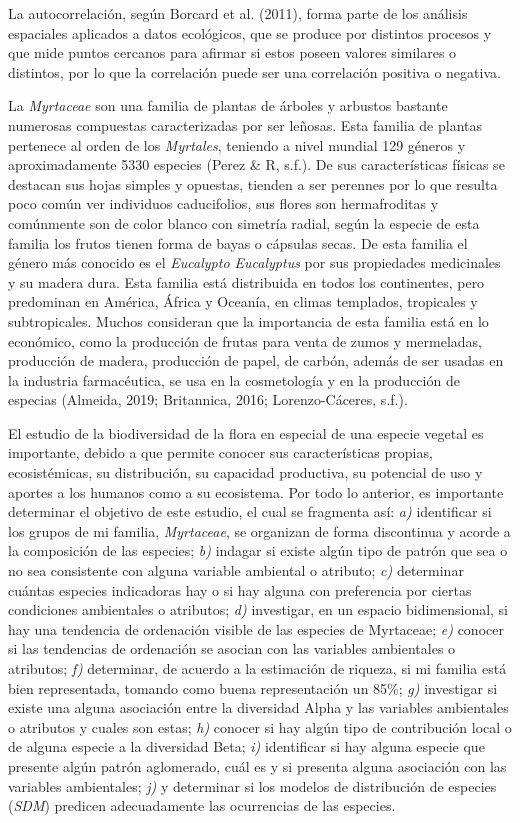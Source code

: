 \documentclass[11pt,]{article}
\begin{document}
La autocorrelación, según Borcard et al. (2011), forma parte de los
análisis espaciales aplicados a datos ecológicos, que se produce por
distintos procesos y que mide puntos cercanos para afirmar si estos
poseen valores similares o distintos, por lo que la correlación puede
ser una correlación positiva o negativa.

La \emph{Myrtaceae} son una familia de plantas de árboles y arbustos
bastante numerosas compuestas caracterizadas por ser leñosas. Esta
familia de plantas pertenece al orden de los \emph{Myrtales}, teniendo a
nivel mundial 129 géneros y aproximadamente 5330 especies (Perez \& R,
s.f.). De sus características físicas se destacan sus hojas simples y
opuestas, tienden a ser perennes por lo que resulta poco común ver
individuos caducifolios, sus flores son hermafroditas y comúnmente son
de color blanco con simetría radial, según la especie de esta familia
los frutos tienen forma de bayas o cápsulas secas. De esta familia el
género más conocido es el \emph{Eucalypto Eucalyptus} por sus
propiedades medicinales y su madera dura. Esta familia está distribuida
en todos los continentes, pero predominan en América, África y Oceanía,
en climas templados, tropicales y subtropicales. Muchos consideran que
la importancia de esta familia está en lo económico, como la producción
de frutas para venta de zumos y mermeladas, producción de madera,
producción de papel, de carbón, además de ser usadas en la industria
farmacéutica, se usa en la cosmetología y en la producción de especias
(Almeida, 2019; Britannica, 2016; Lorenzo-Cáceres, s.f.).

El estudio de la biodiversidad de la flora en especial de una especie
vegetal es importante, debido a que permite conocer sus características
propias, ecosistémicas, su distribución, su capacidad productiva, su
potencial de uso y aportes a los humanos como a su ecosistema. Por todo
lo anterior, es importante determinar el objetivo de este estudio, el
cual se fragmenta así: \emph{a)} identificar si los grupos de mi
familia, \emph{Myrtaceae}, se organizan de forma discontinua y acorde a
la composición de las especies; \emph{b)} indagar si existe algún tipo
de patrón que sea o no sea consistente con alguna variable ambiental o
atributo; \emph{c)} determinar cuántas especies indicadoras hay o si hay
alguna con preferencia por ciertas condiciones ambientales o atributos;
\emph{d)} investigar, en un espacio bidimensional, si hay una tendencia
de ordenación visible de las especies de Myrtaceae; \emph{e)} conocer si
las tendencias de ordenación se asocian con las variables ambientales o
atributos; \emph{f)} determinar, de acuerdo a la estimación de riqueza,
si mi familia está bien representada, tomando como buena representación
un 85\%; \emph{g)} investigar si existe una alguna asociación entre la
diversidad Alpha y las variables ambientales o atributos y cuales son
estas; \emph{h)} conocer si hay algún tipo de contribución local o de
alguna especie a la diversidad Beta; \emph{i)} identificar si hay alguna
especie que presente algún patrón aglomerado, cuál es y si presenta
alguna asociación con las variables ambientales; \emph{j)} y determinar
si los modelos de distribución de especies (\emph{SDM}) predicen
adecuadamente las ocurrencias de las especies.
\end{document}

